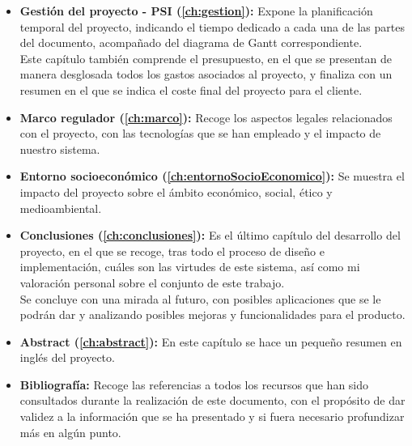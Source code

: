 \begin{itemize}
	\item \textbf{Gestión del proyecto - PSI (\autoref{ch:gestion}):} Expone la planificación temporal del proyecto, indicando el tiempo dedicado a cada una de las partes del documento, acompañado del diagrama de Gantt correspondiente. \\ Este capítulo también comprende el presupuesto, en el que se presentan de manera desglosada todos los gastos asociados al proyecto, y finaliza con un resumen en el que se indica el coste final del proyecto para el cliente.
	\item \textbf{Marco regulador (\autoref{ch:marco}):} Recoge los aspectos legales relacionados con el proyecto, con las tecnologías que se han empleado y el impacto de nuestro sistema.
	\item \textbf{Entorno socioeconómico (\autoref{ch:entornoSocioEconomico}):} Se muestra el impacto del proyecto sobre el ámbito económico, social, ético y medioambiental.
	\item \textbf{Conclusiones (\autoref{ch:conclusiones}):} Es el último capítulo del desarrollo del proyecto, en el que se recoge, tras todo el proceso de diseño e implementación, cuáles son las virtudes de este sistema, así como mi valoración personal sobre el conjunto de este trabajo. \\ Se concluye con una mirada al futuro, con posibles aplicaciones que se le podrán dar y analizando posibles mejoras y funcionalidades para el producto.
	\item \textbf{Abstract (\autoref{ch:abstract}):} En este capítulo se hace un pequeño resumen en inglés del proyecto.
	\item \textbf{Bibliografía:} Recoge las referencias a todos los recursos que han sido consultados durante la realización de este documento, con el propósito de dar validez a la información que se ha presentado y si fuera necesario profundizar más en algún punto.
\end{itemize}